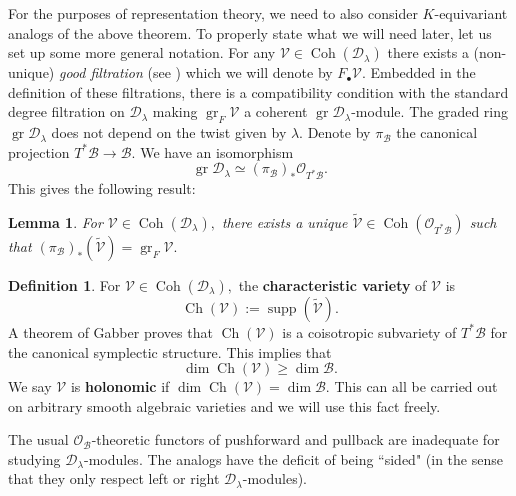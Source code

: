 \documentclass[letterpaper,twosided,11pt]{article}
\theoremstyle{plain}
\newtheorem{lemma}[theorem]{Lemma}
\theoremstyle{definition}
\newtheorem{definition}{Definition}
\theoremstyle{remark}
\newcommand{\script}[1]{\mathscr{#1}}
\newcommand{\gr}{\operatorname{gr }}
\begin{document}
For the purposes of representation theory, we need to also consider $ K $-equivariant
analogs of the above theorem.  To properly state what we will need
later, let us set up some more general notation.  For any $ \script{V}\in
\operatorname{Coh}
(\mathcal{D}_\lambda) $ there exists a (non-unique) \textit{good
filtration} (see
\cite{MilicicLocalization}) which we will denote by $ F_\bullet \script{V}.
$ Embedded in the definition of these filtrations, there is a
compatibility condition with the standard degree filtration on $
\mathcal{D}_\lambda $ making $ \gr_F \script{V} $ a coherent $ \gr
\mathcal{D}_\lambda $-module.  The graded ring $ \gr \mathcal{D}_\lambda
$ does not depend on the twist given by $ \lambda. $ Denote by $ \pi_\mathcal
{B} $ the canonical projection $ T^*\mathcal{B}\to \mathcal{B}. $ We
have an isomorphism
\[
    \gr \mathcal{D}_\lambda\simeq (\pi_\mathcal{B})_*\mathcal{O}_{T^*\mathcal
    {B}}.
\]
This gives the following result:

\begin{lemma}
    For $ \script{V}\in
    \operatorname{Coh}
    (\mathcal{D}_\lambda), $ there exists a unique $ \widetilde{\script{V}}\in
    \operatorname{Coh}
    (\mathcal{O}_{T^*\mathcal{B}}) $ such that $ (\pi_\mathcal{B})_*(\widetilde
    {\script{V}})= \gr_F \script{V}. $
\end{lemma}

\begin{definition}
    For $ \script{V}\in
    \operatorname{Coh}
    (\mathcal{D}_\lambda), $ the \textbf{characteristic variety} of $
    \script{V} $ is
    \[
        \operatorname{Ch}
        (\script{V}):=
        \operatorname{supp}
        (\widetilde{\script{V}}).
    \]
    A theorem of Gabber
    \cite[Theorem 1]{Gabber1981} proves that $
    \operatorname{Ch}
    (\script{V}) $ is a coisotropic subvariety of $ T^*\mathcal{B} $ for
    the canonical symplectic structure.  This implies that
    \[
        \dim
        \operatorname{Ch}
        (\script{V})\geq \dim \mathcal{B}.
    \]
    We say $ \script{V} $ is \textbf{holonomic} if $ \dim
    \operatorname{Ch}
    (\script{V})=\dim \mathcal{B}. $ This can all be carried out on
    arbitrary smooth algebraic varieties and we will use this fact
    freely.
\end{definition}

The usual $ \mathcal{O}_\mathcal{B} $-theoretic functors of pushforward
and pullback are inadequate for studying $ \mathcal{D}_\lambda $-modules.
The analogs have the deficit of being ``sided" (in the sense that they
only respect left or right $ \mathcal{D}_\lambda $-modules).
\end{document}
